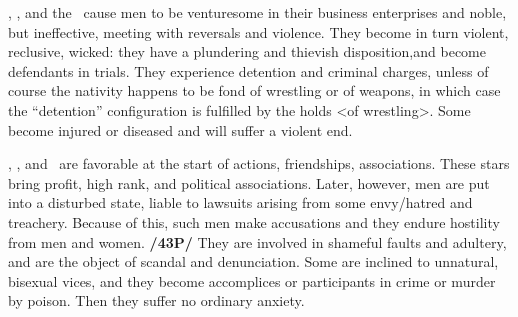 \Saturn, \Mars, and the \Moon\, cause men to be venturesome in their business enterprises and noble, but ineffective, meeting with reversals and violence. They become in turn violent, reclusive, wicked: they have a plundering and thievish disposition,and become defendants in trials. They experience detention and criminal charges, unless of course the nativity happens to be fond of wrestling or of weapons, in which case the “detention” configuration is fulfilled by the holds <of wrestling>. Some become injured or diseased
and will suffer a violent end.

\Saturn, \Mars, and \Venus\, are favorable at the start of actions, friendships, associations. These stars bring profit, high rank, and political associations. Later, however, men are put into a disturbed state, liable to lawsuits arising from some envy/hatred and treachery. Because of this, such men make accusations and they endure hostility from men and women. \textbf{/43P/} They are involved in shameful faults and adultery, and are the object of scandal and denunciation. Some are inclined to unnatural, bisexual vices, and they become accomplices or participants in crime or murder by poison. Then they suffer no ordinary anxiety.


